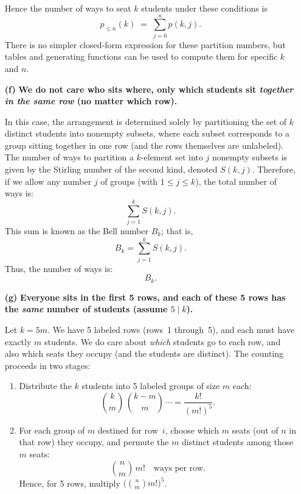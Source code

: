 \documentclass[docmute]{article}
\begin{document}
\begin{enumerate}
    Hence the number of ways to seat \(k\) students under these conditions is
    \[
      \boxed{
        p_{\le n}(k) \;=\;\sum_{j=0}^n p(k,j).
      }
    \]
    There is no simpler closed‐form expression for these partition numbers, but tables and generating functions can be used to compute them for specific \(k\) and \(n\). 
    

    \item[\textbf{(f)}]
    \textbf{We do not care who sits where, only which students sit \emph{together in the same row} (no matter which row).}
    
    In this case, the arrangement is determined solely by partitioning the set of \(k\) distinct students into nonempty subsets, where each subset corresponds to a group sitting together in one row (and the rows themselves are unlabeled). The number of ways to partition a \(k\)-element set into \(j\) nonempty subsets is given by the Stirling number of the second kind, denoted \(S(k,j)\). Therefore, if we allow any number \(j\) of groups (with \(1 \le j \le k\)), the total number of ways is:
    \[
    \sum_{j=1}^{k} S(k,j).
    \]
    This sum is known as the Bell number \(B_k\); that is,
    \[
    B_k = \sum_{j=1}^{k} S(k,j).
    \]
    Thus, the number of ways is:
    \[
    \boxed{B_k.}
    \]
    

  \item[\textbf{(g)}]
    \textbf{Everyone sits in the first 5 rows, and each of these 5 rows has the \emph{same} number of students (assume $5\mid k$).}

    Let \(k=5m\).  We have 5 labeled rows (rows~1 through~5), and each must have exactly \(m\) students.  We do care about \emph{which} students go to each row, and also which seats they occupy (and the students are distinct).  The counting proceeds in two stages:

    \begin{enumerate}
      \item Distribute the $k$ students into 5 labeled groups of size $m$ each:
        \[
          \binom{k}{m}\,\binom{k-m}{m}\,\cdots = \frac{k!}{(m!)^5}.
        \]
      \item For each group of $m$ destined for row~$i$, choose which $m$ seats (out of $n$ in that row) they occupy, and permute the $m$ distinct students among those $m$ seats:
        \[
          \binom{n}{m}\,m! \quad\text{ways per row}.
        \]
      Hence, for 5 rows, multiply $\bigl(\binom{n}{m} m!\bigr)^5$.

    \end{enumerate}


\end{enumerate}
\end{document}
